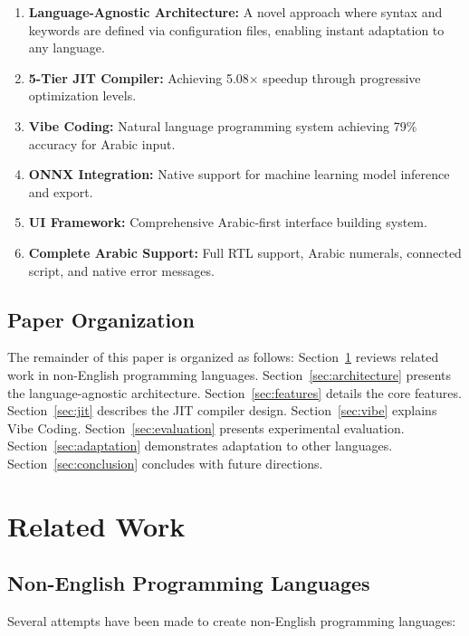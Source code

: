 \documentclass[11pt,a4paper]{article}
\begin{document}
\begin{enumerate}
    \item \textbf{Language-Agnostic Architecture:} A novel approach where syntax and keywords are defined via configuration files, enabling instant adaptation to any language.
    \item \textbf{5-Tier JIT Compiler:} Achieving 5.08$\times$ speedup through progressive optimization levels.
    \item \textbf{Vibe Coding:} Natural language programming system achieving 79\% accuracy for Arabic input.
    \item \textbf{ONNX Integration:} Native support for machine learning model inference and export.
    \item \textbf{UI Framework:} Comprehensive Arabic-first interface building system.
    \item \textbf{Complete Arabic Support:} Full RTL support, Arabic numerals, connected script, and native error messages.
\end{enumerate}

\subsection{Paper Organization}

The remainder of this paper is organized as follows: Section~\ref{sec:related} reviews related work in non-English programming languages. Section~\ref{sec:architecture} presents the language-agnostic architecture. Section~\ref{sec:features} details the core features. Section~\ref{sec:jit} describes the JIT compiler design. Section~\ref{sec:vibe} explains Vibe Coding. Section~\ref{sec:evaluation} presents experimental evaluation. Section~\ref{sec:adaptation} demonstrates adaptation to other languages. Section~\ref{sec:conclusion} concludes with future directions.

\section{Related Work}
\label{sec:related}

\subsection{Non-English Programming Languages}

Several attempts have been made to create non-English programming languages:
\end{document}
